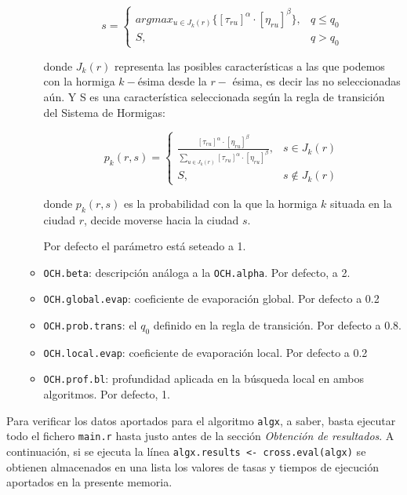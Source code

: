 \documentclass[a4paper,11pt]{article}
\begin{document}
\begin{itemize}
\begin{itemize}
      $$ s= \left\{\begin{array}{cr}
             arg max_{u\in J_k(r)} \big\{[\tau_{ru}]^{\alpha} \cdot [\eta_{ru}]^{\beta}\big\}, & q\le q_0\\
             S, &  q>q_0
            \end{array}\right.
      $$
      
      donde $J_k(r)$ representa las posibles características a las que podemos con la hormiga $k-$ésima
      desde la $r-$ ésima, es decir las no seleccionadas aún. Y S es una característica seleccionada según 
      la regla de transición del Sistema de Hormigas:
      
      $$ p_k(r,s)= 
	     \left\{\begin{array}{cr}
             \frac{[\tau_{ru}]^{\alpha} \cdot [\eta_{ru}]^{\beta}}{\sum_{u\in J_k(r)}[\tau_{ru}]^{\alpha} \cdot [\eta_{ru}]^{\beta}}  , & s\in J_k(r)\\
             S, & s\not\in J_k(r)
            \end{array}\right.
      $$
      
      donde $p_k(r,s)$ es la probabilidad con la que la hormiga $k$ situada en la ciudad $r$, decide moverse
      hacia la ciudad $s$.
    
      Por defecto el parámetro está seteado a 1.
    \item \texttt{OCH.beta}: descripción análoga a la \texttt{OCH.alpha}. Por defecto, a 2.
    \item \texttt{OCH.global.evap}: coeficiente de evaporación global. Por defecto a 0.2
    \item \texttt{OCH.prob.trans}: el $q_0$ definido en la regla de transición. Por defecto a 0.8.
    \item \texttt{OCH.local.evap}: coeficiente de evaporación local. Por defecto a 0.2
    \item \texttt{OCH.prof.bl}: profundidad aplicada en la búsqueda local en ambos algoritmos. Por defecto, 1.
  \end{itemize}
 \end{itemize}
 
 Para verificar los datos aportados para el algoritmo \texttt{algx}, a saber, basta ejecutar todo el fichero \texttt{main.r}
 hasta justo antes de la sección \textit{Obtención de resultados}. A continuación, si se ejecuta la línea 
 \texttt{algx.results <- cross.eval(algx)} se obtienen almacenados en una lista los valores de tasas y tiempos de ejecución
 aportados en la presente memoria. 
 
\end{document}
